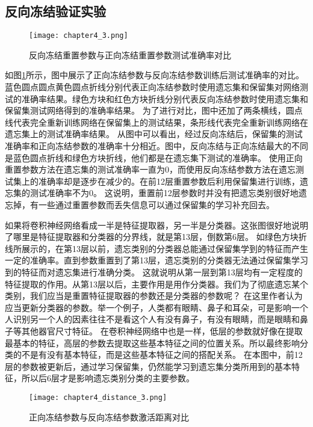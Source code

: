 \subsection{反向冻结验证实验}
\begin{figure}
    \centering
    \texttt{[image: chapter4\_3.png]}
    \caption{反向冻结重置参数与正向冻结重置参数测试准确率对比}
    \label{fig:chapter4_3}
\end{figure}

如图\ref{fig:chapter4_3}所示，图中展示了正向冻结参数与反向冻结参数训练后测试准确率的对比。
蓝色圆点圆点黄色圆点折线分别代表正向冻结参数时使用遗忘集和保留集对网络测试的准确率结果。绿色方块和红色方块折线分别代表反向冻结参数时使用遗忘集和保留集测试网络得到的准确率结果。
为了进行对比，图中还加了两条横线，圆点线代表完全重新训练网络在保留集上的测试结果，条形线代表完全重新训练网络在遗忘集上的测试准确率结果。
从图中可以看出，经过反向冻结后，保留集的测试准确率和正向冻结参数的准确率十分相近。图中，反向冻结与正向冻结最大的不同是蓝色圆点折线和绿色方块折线，他们都是在遗忘集下测试的准确率。
使用正向重置参数方法在遗忘集的测试准确率一直为0，而使用反向冻结参数方法在遗忘测试集上的准确率却是逐步在减少的。在前12层重置参数后利用保留集进行训练，遗忘集的测试准确率不为0。
这说明，重置前12层参数时并没有把遗忘类别很好地遗忘掉，有一些通过重置参数而丢失信息可以通过保留集的学习补充回去。

如果将卷积神经网络看成一半是特征提取器，另一半是分类器。这张图很好地说明了哪里是特征提取器和分类器的分界线，就是第13层，倒数第6层。
如绿色方块折线所展示的，在第13层以前，遗忘类别的分类器总能通过保留集学到的特征而产生一定的准确率。直到参数重置到了第13层，遗忘类别的分类器无法通过保留集学习到的特征而对遗忘集进行准确分类。
这就说明从第一层到第13层均有一定程度的特征提取的作用。从第13层以后，主要作用是用作分类器。我们为了彻底遗忘某个类别，我们应当是重置特征提取器的参数还是分类器的参数呢？
在这里作者认为应当更新分类器的参数。举一个例子，人类都有眼睛、鼻子和耳朵，可是影响一个人识别另一个人的因素往往不是看这个人有没有鼻子，有没有眼睛，而是眼睛和鼻子等其他器官尺寸特征。
在卷积神经网络中也是一样，低层的参数就好像在提取最基本的特征，高层的参数去提取这些基本特征之间的位置关系。所以最终影响分类的不是有没有基本特征，而是这些基本特征之间的搭配关系。
在本图中，前12层的参数被更新后，通过学习保留集，仍然能学习到遗忘集分类所用到的基本特征，所以后6层才是影响遗忘类别分类的主要参数。
\begin{figure}
    \centering
    \texttt{[image: chapter4\_distance\_3.png]}
    \caption{正向冻结参数与反向冻结参数激活距离对比}
    \label{fig:chapter4_distance_3}
\end{figure}


